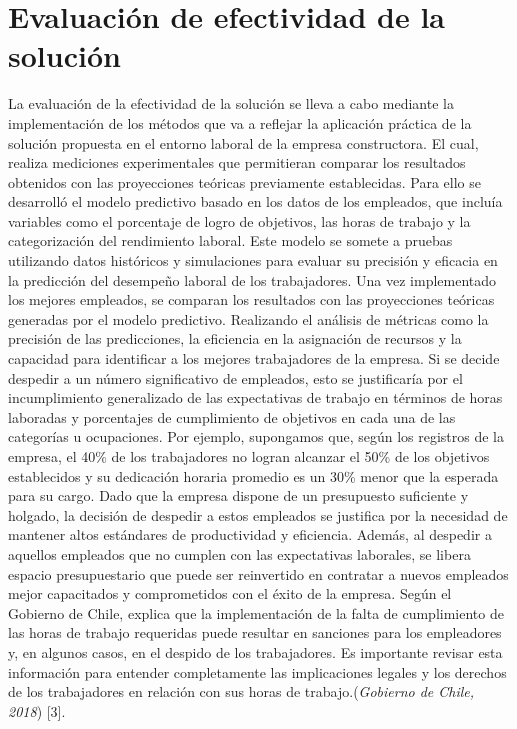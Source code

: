 \documentclass{plantillauft}
\begin{document}
\section{Evaluación de efectividad de la solución}
La evaluación de la efectividad de la solución se lleva a cabo mediante la implementación de los métodos que va a reflejar la aplicación práctica de la solución propuesta en el entorno laboral de la empresa constructora. El cual, realiza mediciones experimentales que permitieran comparar los resultados obtenidos con las proyecciones teóricas previamente establecidas.
\newline
\newline
Para ello se desarrolló el modelo predictivo basado en los datos de los empleados, que incluía variables como el porcentaje de logro de objetivos, las horas de trabajo y la categorización del rendimiento laboral. Este modelo se somete a pruebas utilizando datos históricos y simulaciones para evaluar su precisión y eficacia en la predicción del desempeño laboral de los trabajadores. Una vez implementado los mejores empleados, se comparan los resultados con las proyecciones teóricas generadas por el modelo predictivo. Realizando el análisis de métricas como la precisión de las predicciones, la eficiencia en la asignación de recursos y la capacidad para identificar a los mejores trabajadores de la empresa.
\newline
\newline
Si se decide despedir a un número significativo de empleados, esto se justificaría por el incumplimiento generalizado de las expectativas de trabajo en términos de horas laboradas y porcentajes de cumplimiento de objetivos en cada una de las categorías u ocupaciones. Por ejemplo, supongamos que, según los registros de la empresa, el 40\% de los trabajadores no logran alcanzar el 50\% de los objetivos establecidos y su dedicación horaria promedio es un 30\% menor que la esperada para su cargo.
\newline
\newline
Dado que la empresa dispone de un presupuesto suficiente y holgado, la decisión de despedir a estos empleados se justifica por la necesidad de mantener altos estándares de productividad y eficiencia. Además, al despedir a aquellos empleados que no cumplen con las expectativas laborales, se libera espacio presupuestario que puede ser reinvertido en contratar a nuevos empleados mejor capacitados y comprometidos con el éxito de la empresa. Según el Gobierno de Chile, explica que la implementación de la falta de cumplimiento de las horas de trabajo requeridas puede resultar en sanciones para los empleadores y, en algunos casos, en el despido de los trabajadores. Es importante revisar esta información para entender completamente las implicaciones legales y los derechos de los trabajadores en relación con sus horas de trabajo.(\textit{Gobierno de Chile, 2018}) [3].
\end{document}
